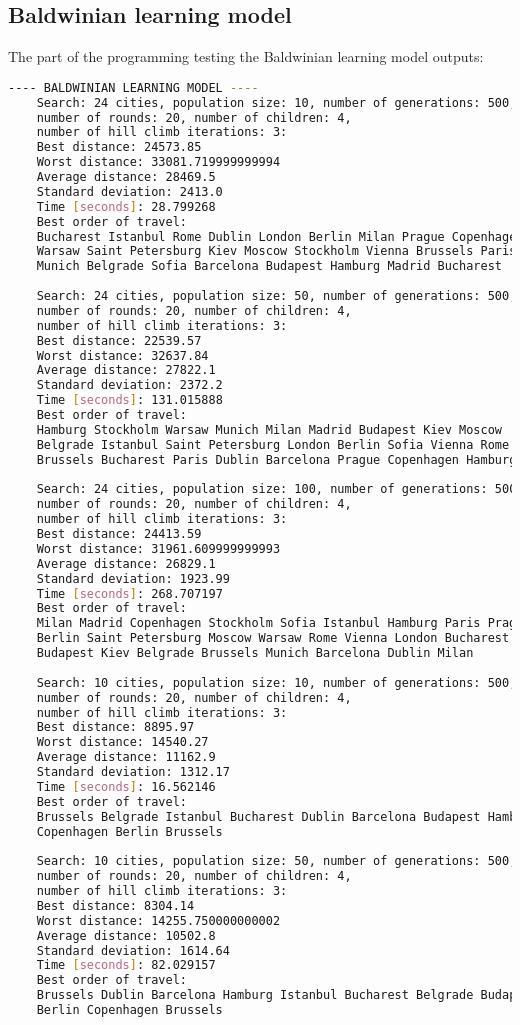 \documentclass{article}
\begin{document}
\subsection{Baldwinian learning model}
The part of the programming testing the Baldwinian learning model outputs:
\begin{lstlisting}[language=bash]
	---- BALDWINIAN LEARNING MODEL ----
	Search: 24 cities, population size: 10, number of generations: 500, 
	number of rounds: 20, number of children: 4, 
	number of hill climb iterations: 3: 
	Best distance: 24573.85
	Worst distance: 33081.719999999994
	Average distance: 28469.5
	Standard deviation: 2413.0
	Time [seconds]: 28.799268
	Best order of travel: 
	Bucharest Istanbul Rome Dublin London Berlin Milan Prague Copenhagen 
	Warsaw Saint Petersburg Kiev Moscow Stockholm Vienna Brussels Paris 
	Munich Belgrade Sofia Barcelona Budapest Hamburg Madrid Bucharest
 
	Search: 24 cities, population size: 50, number of generations: 500, 
	number of rounds: 20, number of children: 4,
	number of hill climb iterations: 3: 
	Best distance: 22539.57
	Worst distance: 32637.84
	Average distance: 27822.1
	Standard deviation: 2372.2
	Time [seconds]: 131.015888
	Best order of travel: 
	Hamburg Stockholm Warsaw Munich Milan Madrid Budapest Kiev Moscow 
	Belgrade Istanbul Saint Petersburg London Berlin Sofia Vienna Rome 
	Brussels Bucharest Paris Dublin Barcelona Prague Copenhagen Hamburg
 
	Search: 24 cities, population size: 100, number of generations: 500, 
	number of rounds: 20, number of children: 4, 
	number of hill climb iterations: 3: 
	Best distance: 24413.59
	Worst distance: 31961.609999999993
	Average distance: 26829.1
	Standard deviation: 1923.99
	Time [seconds]: 268.707197
	Best order of travel: 
	Milan Madrid Copenhagen Stockholm Sofia Istanbul Hamburg Paris Prague 
	Berlin Saint Petersburg Moscow Warsaw Rome Vienna London Bucharest 
	Budapest Kiev Belgrade Brussels Munich Barcelona Dublin Milan
 
	Search: 10 cities, population size: 10, number of generations: 500, 
	number of rounds: 20, number of children: 4, 
	number of hill climb iterations: 3: 
	Best distance: 8895.97
	Worst distance: 14540.27
	Average distance: 11162.9
	Standard deviation: 1312.17
	Time [seconds]: 16.562146
	Best order of travel: 
	Brussels Belgrade Istanbul Bucharest Dublin Barcelona Budapest Hamburg 
	Copenhagen Berlin Brussels
 
	Search: 10 cities, population size: 50, number of generations: 500, 
	number of rounds: 20, number of children: 4, 
	number of hill climb iterations: 3: 
	Best distance: 8304.14
	Worst distance: 14255.750000000002
	Average distance: 10502.8
	Standard deviation: 1614.64
	Time [seconds]: 82.029157
	Best order of travel: 
	Brussels Dublin Barcelona Hamburg Istanbul Bucharest Belgrade Budapest 
	Berlin Copenhagen Brussels
 

\end{lstlisting}
\end{document}
